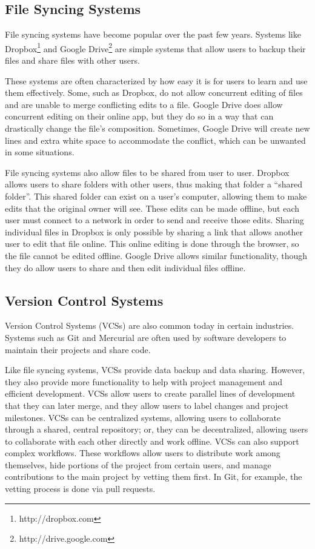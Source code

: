 \subsection{File Syncing Systems}

File syncing systems have become popular over the past few years. Systems like Dropbox\footnote{http://dropbox.com} and Google Drive\footnote{http://drive.google.com} are simple systems that allow users to backup their files and share files with other users. 

These systems are often characterized by how easy it is for users to learn and use them effectively. Some, such as Dropbox, do not allow concurrent editing of files and are unable to merge conflicting edits to a file. Google Drive does allow concurrent editing on their online app, but they do so in a way that can drastically change the file's composition. Sometimes, Google Drive will create new lines and extra white space to accommodate the conflict, which can be unwanted in some situations. 

File syncing systems also allow files to be shared from user to user. Dropbox allows users to share folders with other users, thus making that folder a ``shared folder''. This shared folder can exist on a user's computer, allowing them to make edits that the original owner will see. These edits can be made offline, but each user must connect to a network in order to send and receive those edits. Sharing individual files in Dropbox is only possible by sharing a link that allows another user to edit that file online. This online editing is done through the browser, so the file cannot be edited offline. Google Drive allows similar functionality, though they do allow users to share and then edit individual files offline.

\subsection{Version Control Systems}

Version Control Systems (VCSs) are also common today in certain industries. Systems such as Git and Mercurial are often used by software developers to maintain their projects and share code.

Like file syncing systems, VCSs provide data backup and data sharing. However, they also provide more functionality to help with project management and efficient development. VCSs allow users to create parallel lines of development that they can later merge, and they allow users to label changes and project milestones. VCSs can be centralized systems, allowing users to collaborate through a shared, central repository; or, they can be decentralized, allowing users to collaborate with each other directly and work offline. VCSs can also support complex workflows. These workflows allow users to distribute work among themselves, hide portions of the project from certain users, and manage contributions to the main project by vetting them first. In Git, for example, the vetting process is done via pull requests.

